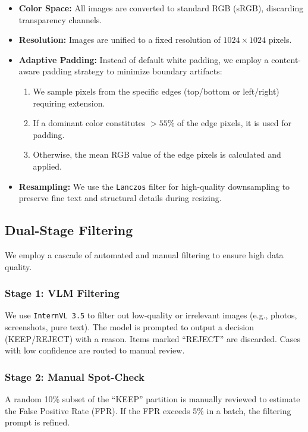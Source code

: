 \documentclass[runningheads]{llncs}
\begin{document}
\begin{itemize}
    \item \textbf{Color Space:} All images are converted to standard RGB (sRGB), discarding transparency channels.
    \item \textbf{Resolution:} Images are unified to a fixed resolution of $1024 \times 1024$ pixels.
    \item \textbf{Adaptive Padding:} Instead of default white padding, we employ a content-aware padding strategy to minimize boundary artifacts:
    \begin{enumerate}
        \item We sample pixels from the specific edges (top/bottom or left/right) requiring extension.
        \item If a dominant color constitutes $>55\%$ of the edge pixels, it is used for padding.
        \item Otherwise, the mean RGB value of the edge pixels is calculated and applied.
    \end{enumerate}
    \item \textbf{Resampling:} We use the \texttt{Lanczos} filter for high-quality downsampling to preserve fine text and structural details during resizing.
\end{itemize}

\subsection{Dual-Stage Filtering}
We employ a cascade of automated and manual filtering to ensure high data quality.

\subsubsection{Stage 1: VLM Filtering}
We use \texttt{InternVL 3.5} to filter out low-quality or irrelevant images (e.g., photos, screenshots, pure text). The model is prompted to output a decision (KEEP/REJECT) with a reason. Items marked ``REJECT'' are discarded. Cases with low confidence are routed to manual review.

\subsubsection{Stage 2: Manual Spot-Check}
A random 10\% subset of the ``KEEP'' partition is manually reviewed to estimate the False Positive Rate (FPR). If the FPR exceeds 5\% in a batch, the filtering prompt is refined.
\end{document}
